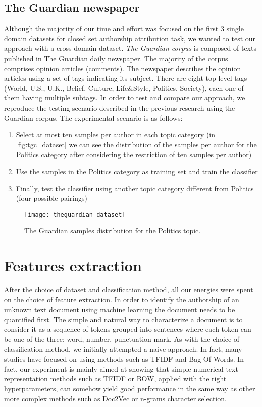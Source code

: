 \subsection{The Guardian newspaper}
\label{ssec:guardian}
Although the majority of our time and effort was focused on the first 3 single domain datasets for closed set authorship attribution task, we wanted to test our approach with a cross domain dataset.
\textit{The Guardian corpus} is composed of texts published in The Guardian daily newspaper. The majority of the corpus comprises opinion articles
(comments). The newspaper describes the opinion articles using a set of tags indicating its subject. There are eight top-level tags (World, U.S., U.K., Belief, Culture, Life\&Style, Politics, Society), each one of them having multiple subtags.
In order to test and compare our approach, we reproduce the testing scenario
described in the previous research \cite{stamatatos2013robustness} using the Guardian corpus. The experimental
scenario is as follows: 
\begin{enumerate}
	\item Select at most ten samples per author in each topic category
	(in \autoref{fig:tgc_dataset} we can see the distribution of the samples per author for the Politics category after considering
	the restriction of ten samples per author)
	\item Use the samples in the Politics category as training set and train the classifier
	\item Finally, test the classifier using
	another topic category different from Politics (four possible pairings)
\end{enumerate}

\begin{figure}[ht]
	\centering
	\texttt{[image: theguardian\_dataset]}
	\caption[The Guardian Politics samples distribution]{The Guardian samples distribution for the Politics topic.}
	\label{fig:tgc_dataset}
\end{figure}

\section{Features extraction}
After the choice of dataset and classification method, all our energies were spent on the choice of feature extraction. In order to identify the authorship of an unknown text document using machine learning the document needs to be quantified first. The simple and natural way to characterize a document is to consider it as a sequence of tokens grouped into sentences where each token can be one of the three: word, number, punctuation mark.
As with the choice of classification method, we initially attempted a naive approach. In fact, many studies have focused on using methods such as TFIDF and Bag Of Words. In fact, our experiment is mainly aimed at showing that simple numerical text representation methods such as TFIDF or BOW, applied with the right hyperparameters, can somehow yield good performance in the same way as other more complex methods such as Doc2Vec or n-grams character selection.
